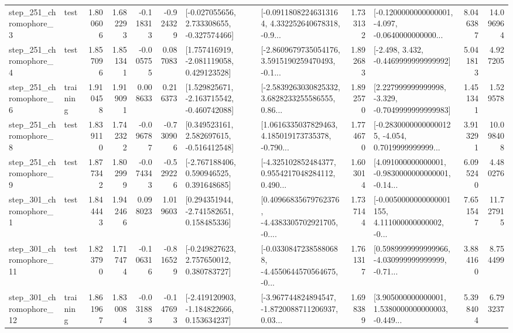 \begin{tabular}{llrrrrllrlrr}
   step\_251\_chromophore\_3 &      test &      1.800606 &    1.682293 &     -0.118313 & -0.924329 &   [-0.027055656, 2.733308655, -0.327574466] &  [-0.09118082246313164, 4.332252640678318, -0.9... &       1.733132 &  [-0.1200000000000001, -4.097, -0.0640000000000... &            8.046387 &         14.096964 \\
   step\_251\_chromophore\_4 &      test &      1.857096 &    1.851341 &     -0.005755 &  0.087083 &    [1.757416919, -2.081119058, 0.429123528] &  [-2.8609679735054176, 3.5915190259470493, -0.1... &       1.892683 &               [-2.498, 3.432, -0.4469999999999992] &            5.041813 &          4.927205 \\
   step\_251\_chromophore\_6 &  training &      1.910458 &    1.919091 &      0.008633 &  0.216373 &   [1.529825671, -2.163715542, -0.460742088] &  [-2.5839263030825332, 3.6828233255586555, 0.86... &       1.892570 &   [2.227999999999998, -3.329, -0.7049999999999983] &            1.451341 &          1.529578 \\
   step\_251\_chromophore\_8 &      test &      1.839110 &    1.742322 &     -0.096787 & -0.730906 &    [0.349523161, 2.582697615, -0.516412548] &  [1.0616335037829463, 4.185019173735378, -0.790... &       1.774670 &  [-0.28300000000000125, -4.054, 0.7019999999999... &            3.913291 &         10.098408 \\
   step\_251\_chromophore\_9 &      test &      1.877342 &    1.802999 &     -0.074343 & -0.529226 &    [-2.767188406, 0.590946525, 0.391648685] &  [-4.325102852484377, 0.9554217048284112, 0.490... &       1.603014 &  [4.091000000000001, -0.9830000000000001, -0.14... &            6.095240 &          4.480276 \\
   step\_301\_chromophore\_1 &      test &      1.844443 &    1.942466 &      0.098023 &  1.019603 &    [0.294351944, -2.741582651, 0.158485336] &  [0.40966835679762376, -4.4383305702921705, -0.... &       1.737144 &  [-0.0050000000000001155, 4.111000000000002, -0... &            7.651547 &         11.727915 \\
  step\_301\_chromophore\_11 &      test &      1.823790 &    1.717474 &     -0.106316 & -0.816529 &    [-0.249827623, 2.757650012, 0.380783727] &  [-0.03308472385880688, -4.4550644570564675, -0... &       1.761317 &  [0.5989999999999966, -4.030999999999999, -0.71... &            3.884160 &          8.754499 \\
  step\_301\_chromophore\_12 &  training &      1.861967 &    1.830084 &     -0.031883 & -0.147693 &   [-2.419120903, -1.184822666, 0.153634237] &  [-3.967744824894547, -1.8720088711206937, 0.03... &       1.698389 &  [3.905000000000001, 1.5380000000000003, -0.449... &            5.398404 &          6.793237 \\

\end{tabular}
